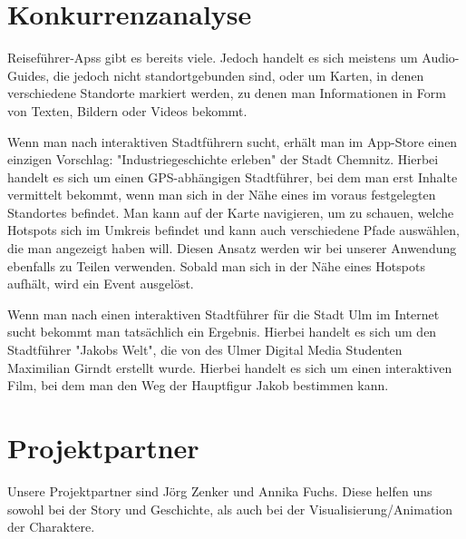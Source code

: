 \documentclass[]{hci-proposal}
\begin{document}
\section{Konkurrenzanalyse}

Reiseführer-Apss gibt es bereits viele. Jedoch handelt es sich meistens um Audio-Guides, die jedoch nicht standortgebunden sind,
oder um Karten, in denen verschiedene Standorte markiert werden, zu denen man Informationen in Form von Texten, Bildern oder
Videos bekommt.

Wenn man nach interaktiven Stadtführern sucht, erhält man im App-Store einen einzigen Vorschlag: "Industriegeschichte erleben" der
Stadt Chemnitz. Hierbei handelt es sich um einen GPS-abhängigen Stadtführer, bei dem man erst Inhalte vermittelt bekommt, wenn man sich
in der Nähe eines im voraus festgelegten Standortes befindet. Man kann auf der Karte navigieren, um zu schauen, welche Hotspots
sich im Umkreis befindet und kann auch verschiedene Pfade auswählen, die man angezeigt haben will.
Diesen Ansatz werden wir bei unserer Anwendung ebenfalls zu Teilen verwenden. Sobald man sich in der Nähe eines Hotspots aufhält,
wird ein Event ausgelöst.

Wenn man nach einen interaktiven Stadtführer für die Stadt Ulm im Internet sucht bekommt man tatsächlich ein Ergebnis. Hierbei handelt
es sich um den Stadtführer "Jakobs Welt", die von des Ulmer Digital Media Studenten Maximilian Girndt erstellt wurde. Hierbei
handelt es sich um einen interaktiven Film, bei dem man den Weg der Hauptfigur Jakob bestimmen kann.


\section{Projektpartner}
Unsere Projektpartner sind Jörg Zenker und Annika Fuchs. Diese helfen uns sowohl bei der Story und Geschichte,
als auch bei der Visualisierung/Animation der Charaktere.
\end{document}
